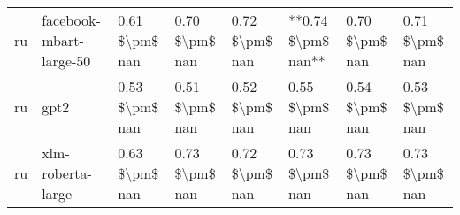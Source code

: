 \begin{tabular}{llllllll}
      ru &            facebook-mbart-large-50 & 0.61 \$\textbackslash pm\$ nan &            0.70 \$\textbackslash pm\$ nan &        0.72 \$\textbackslash pm\$ nan &     **0.74 \$\textbackslash pm\$ nan** &                          0.70 \$\textbackslash pm\$ nan &     0.71 \$\textbackslash pm\$ nan \\
      ru &                               gpt2 & 0.53 \$\textbackslash pm\$ nan &            0.51 \$\textbackslash pm\$ nan &        0.52 \$\textbackslash pm\$ nan &         0.55 \$\textbackslash pm\$ nan &                          0.54 \$\textbackslash pm\$ nan &     0.53 \$\textbackslash pm\$ nan \\
      ru &                  xlm-roberta-large & 0.63 \$\textbackslash pm\$ nan &            0.73 \$\textbackslash pm\$ nan &        0.72 \$\textbackslash pm\$ nan &         0.73 \$\textbackslash pm\$ nan &                          0.73 \$\textbackslash pm\$ nan &     0.73 \$\textbackslash pm\$ nan \\
\bottomrule
\end{tabular}
